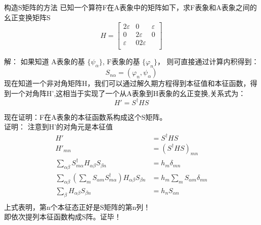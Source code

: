 \begin{frame}
    \begin{tcolorbox2}{构造S矩阵的方法}
        已知一个算符F在A表象中的矩阵如下，求F表象和A表象之间的幺正变换矩阵S
        $$ H=
        \begin{bmatrix}
            2\varepsilon  & 0 & \varepsilon\\
            0 & 2\varepsilon & 0 \\
            \varepsilon & 0 2\varepsilon\\
        \end{bmatrix} $$
     \end{tcolorbox2}
     \alert{解：} 如果知道 A表象的基 $\{\psi_\alpha \}$, F表象的基 $ \{\varphi_n \}$， 则可直接通过计算内积得到：
     $$ S_{n\alpha} =(\varphi_n, \psi_\alpha) $$
     现在知道一个非对角矩阵H，我们可以通过解久期方程得到本征值和本征函数，得到一个对角阵H',这相当于实现了一个从A表象到H表象的幺正变换,关系式为：
     $$ H'=S^\dagger H S$$
\end{frame}  

\begin{frame}
现在证明：F在A表象的本征函数系构成这个S矩阵。\\
\alert{证明：} 注意到H'的对角元是本征值
\begin{equation*}
    \begin{split}
    H' &=S^\dagger H S \\
    H'_{mn} &=(S^\dagger H S)_{mn}  \\
    \sum_{\alpha \beta} S^{\dagger} _{m \alpha} H_{\alpha \beta} S_{\beta n} & = h_m \delta_{mn} \\
    \sum_{\alpha \beta} (\sum_m S_{\alpha m} S^\dagger_{m \alpha}) H_{\alpha \beta} S_{\beta n} &= h_m \sum_m S_{\alpha m}\delta_{mn} \\
    \sum_{\beta} H_{\alpha \beta} S_{\beta n} &= h_n S_{\alpha n} \\
    \end{split} 
\end{equation*} 
上式表明，第n个本征态正好是S矩阵的第n列！\\
即依次提列本征函数构成S阵。证毕！
\end{frame} 


 



